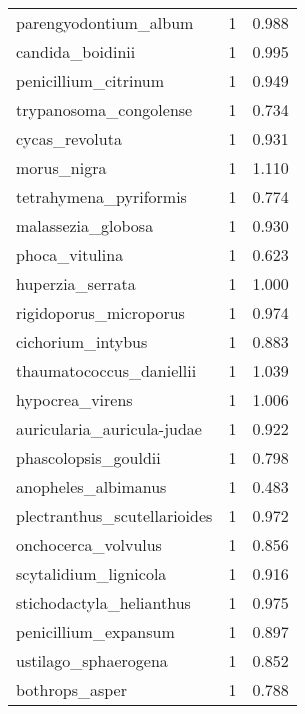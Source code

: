 \begin{tabular}{lrr}
          parengyodontium\_album &                   1 &     0.988 \\
               candida\_boidinii &                   1 &     0.995 \\
           penicillium\_citrinum &                   1 &     0.949 \\
         trypanosoma\_congolense &                   1 &     0.734 \\
                 cycas\_revoluta &                   1 &     0.931 \\
                    morus\_nigra &                   1 &     1.110 \\
         tetrahymena\_pyriformis &                   1 &     0.774 \\
             malassezia\_globosa &                   1 &     0.930 \\
                 phoca\_vitulina &                   1 &     0.623 \\
               huperzia\_serrata &                   1 &     1.000 \\
         rigidoporus\_microporus &                   1 &     0.974 \\
              cichorium\_intybus &                   1 &     0.883 \\
       thaumatococcus\_daniellii &                   1 &     1.039 \\
                hypocrea\_virens &                   1 &     1.006 \\
     auricularia\_auricula-judae &                   1 &     0.922 \\
           phascolopsis\_gouldii &                   1 &     0.798 \\
            anopheles\_albimanus &                   1 &     0.483 \\
   plectranthus\_scutellarioides &                   1 &     0.972 \\
            onchocerca\_volvulus &                   1 &     0.856 \\
          scytalidium\_lignicola &                   1 &     0.916 \\
       stichodactyla\_helianthus &                   1 &     0.975 \\
           penicillium\_expansum &                   1 &     0.897 \\
           ustilago\_sphaerogena &                   1 &     0.852 \\
                 bothrops\_asper &                   1 &     0.788 \\

\end{tabular}
